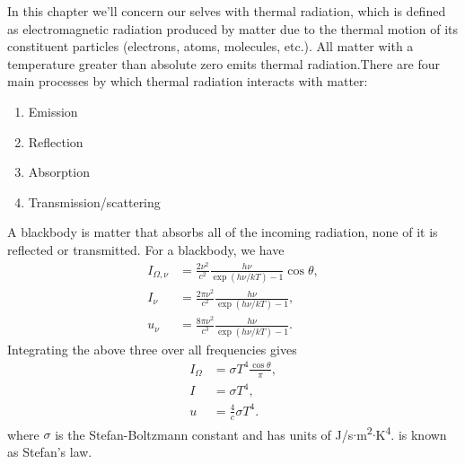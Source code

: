 \documentclass[a4paper,11pt]{report}
\begin{document}
In this chapter we'll concern our selves with thermal radiation, which is defined as electromagnetic radiation produced by matter due to the thermal motion of its constituent particles (electrons, atoms, molecules, etc.). All matter with a temperature greater than absolute zero emits thermal radiation.There are four main processes by which thermal radiation interacts with matter:
\begin{enumerate}
    \item Emission
    \item Reflection
    \item Absorption
    \item Transmission/scattering
\end{enumerate}

A blackbody is matter that absorbs all of the incoming radiation, none of it is reflected or transmitted. For a blackbody, we have
\begin{align}
    I_{\Omega,\nu} &= \frac{2 \nu^2}{c^2} \frac{h \nu}{\exp (h\nu/kT) - 1} \cos \theta, \\
    I_\nu &= \frac{2 \pi \nu^2}{c^2} \frac{h \nu}{\exp (h\nu/kT) - 1}, \\
    u_\nu &= \frac{8 \pi \nu^2}{c^3} \frac{h \nu}{\exp (h\nu/kT) - 1} .
\end{align}
Integrating the above three over all frequencies gives 
\begin{align}
    I_{\Omega} &= \sigma T^4 \frac{\cos \theta}{\pi}, \\
    I &= \sigma T^4, \label{eq:th_rad_stefans_law}\\
    u &= \frac{4}{c} \sigma T^4.
\end{align}
where $\sigma$ is the Stefan-Boltzmann constant and has units of J/s$\cdot$m\textsuperscript{2}$\cdot$K\textsuperscript{4}.  is known as Stefan's law.
\end{document}
